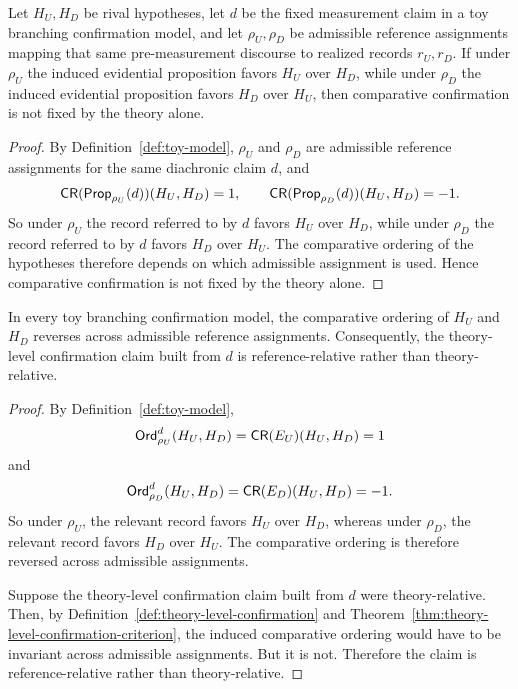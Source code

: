 \begin{proposition}
\label{prop:toy-role-divergent}
\label{prop:hypothesis-order-instability-witness}
Let $H_U,H_D$ be rival hypotheses, let $d$ be the fixed measurement claim in a toy branching
confirmation model, and let $\rho_U,\rho_D$ be admissible reference assignments mapping that same
pre-measurement discourse to realized records $r_U,r_D$. If under $\rho_U$ the induced evidential
proposition favors $H_U$ over $H_D$, while under $\rho_D$ the induced evidential proposition favors
$H_D$ over $H_U$, then comparative confirmation is not fixed by the theory alone.
\end{proposition}

\begin{proof}
By Definition~\ref{def:toy-model}, $\rho_U$ and $\rho_D$ are admissible reference assignments for
the same diachronic claim $d$, and
\[
\mathsf{CR}(\mathsf{Prop}_{\rho_U}(d))(H_U,H_D)=1,
\qquad
\mathsf{CR}(\mathsf{Prop}_{\rho_D}(d))(H_U,H_D)=-1.
\]
So under $\rho_U$ the record referred to by $d$ favors $H_U$ over $H_D$, while under $\rho_D$ the
record referred to by $d$ favors $H_D$ over $H_U$. The comparative ordering of the hypotheses
therefore depends on which admissible assignment is used. Hence comparative confirmation is not
fixed by the theory alone.
\end{proof}

\begin{theorem}
\label{thm:toy-reversal}
In every toy branching confirmation model, the comparative ordering of $H_U$ and $H_D$ reverses across admissible reference assignments. Consequently, the theory-level confirmation claim built from $d$ is reference-relative rather than theory-relative.
\end{theorem}

\begin{proof}
By Definition~\ref{def:toy-model},
\[
\mathsf{Ord}_{\rho_U}^d(H_U,H_D)=\mathsf{CR}(E_U)(H_U,H_D)=1
\]
and
\[
\mathsf{Ord}_{\rho_D}^d(H_U,H_D)=\mathsf{CR}(E_D)(H_U,H_D)=-1.
\]
So under $\rho_U$, the relevant record favors $H_U$ over $H_D$, whereas under $\rho_D$, the relevant record favors $H_D$ over $H_U$. The comparative ordering is therefore reversed across admissible assignments.

Suppose the theory-level confirmation claim built from $d$ were theory-relative. Then, by Definition~\ref{def:theory-level-confirmation} and Theorem~\ref{thm:theory-level-confirmation-criterion}, the induced comparative ordering would have to be invariant across admissible assignments. But it is not. Therefore the claim is reference-relative rather than theory-relative.
\end{proof}

